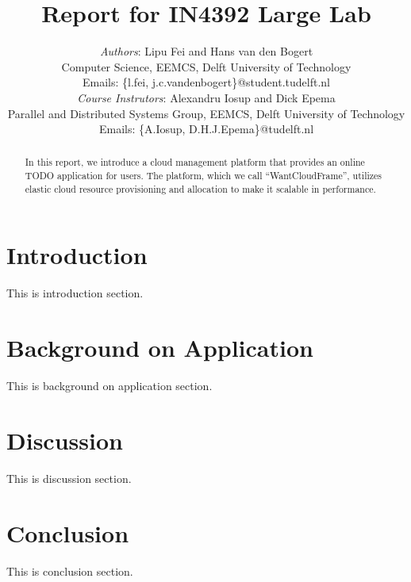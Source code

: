 \documentclass[10pt, a4paper, twoside, twocolumn, technote]{IEEEtran}
\begin{document}
\title{Report for IN4392 Large Lab}
\author{\textit{Authors}: Lipu Fei and Hans van den Bogert\\
Computer Science, EEMCS, Delft University of Technology\\
Emails: \{l.fei, j.c.vandenbogert\}@student.tudelft.nl\\
\textit{Course Instrutors}: Alexandru Iosup and Dick Epema\\
Parallel and Distributed Systems Group, EEMCS, Delft University of Technology\\
Emails: \{A.Iosup, D.H.J.Epema\}@tudelft.nl}


\maketitle


\begin{abstract}
In this report, we introduce a cloud management platform that provides an online TODO application for users. The platform, which we call ``WantCloudFrame'', utilizes elastic cloud resource provisioning and allocation to make it scalable in performance.
\end{abstract}

\section{Introduction}
This is introduction section.

\section{Background on Application}
This is background on application section.





\section{Discussion}
This is discussion section.

\section{Conclusion}
This is conclusion section.



\end{document}
